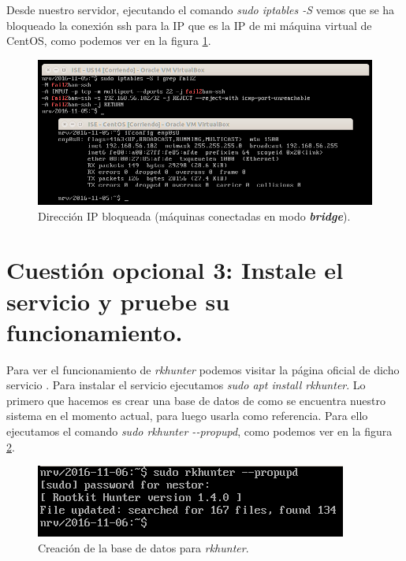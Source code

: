 \documentclass[a4paper,titlepage,12pt]{scrartcl}	%
\numberwithin{figure}{section} %
\numberwithin{table}{section} %
\begin{document}
	Desde nuestro servidor, ejecutando el comando \textit{sudo iptables -S} vemos que se ha bloqueado la conexión ssh para la IP \textit{} que es la IP de mi máquina virtual de CentOS, como podemos ver en la figura \ref{O2-iptables}.
	\begin{figure}[H]
		\includegraphics[width=\linewidth]{./Imagenes/O2-iptables.png}
		\vspace{-0.5cm}
		\caption[Dirección IP bloqueada (máquinas conectadas en modo \textit{\textbf{bridge}}).]{Dirección IP bloqueada (máquinas conectadas en modo \textit{\textbf{bridge}}).}
		\label{O2-iptables}
	\end{figure}
	
	\section[Cuestión opcional 3: Instale el servicio y pruebe su funcionamiento.]{Cuestión opcional 3: Instale el servicio y pruebe su funcionamiento.}
	
	Para ver el funcionamiento de \textit{rkhunter} podemos visitar la página oficial de dicho servicio \cite{rkhunter}. Para instalar el servicio ejecutamos \textit{sudo apt install rkhunter}. Lo primero que hacemos es crear una base de datos de como se encuentra nuestro sistema en el momento actual, para luego usarla como referencia. Para ello ejecutamos el comando \textit{sudo rkhunter {-}-propupd}, como podemos ver en la figura \ref{O3-propupd}.
	\begin{figure}[H]
		\includegraphics[width=\linewidth]{./Imagenes/O3-propupd.png}
		\vspace{-0.5cm}
		\caption[Creación de la base de datos para \textit{rkhunter}.]{Creación de la base de datos para \textit{rkhunter}.}
		\label{O3-propupd}
	\end{figure}
	
\end{document}
